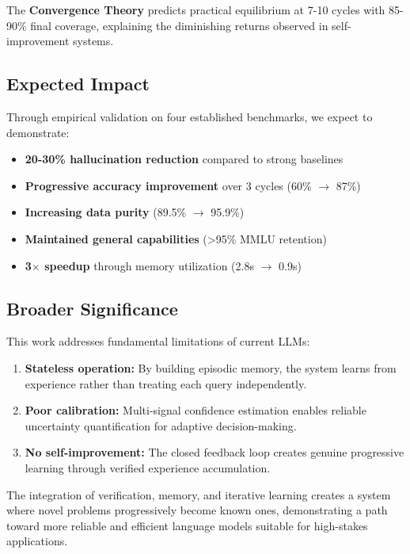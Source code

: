 \documentclass[12pt,a4paper]{article}
\theoremstyle{definition}
\begin{document}
The \textbf{Convergence Theory} predicts practical equilibrium at 7-10 cycles with 85-90\% final coverage, explaining the diminishing returns observed in self-improvement systems.

\subsection{Expected Impact}

Through empirical validation on four established benchmarks, we expect to demonstrate:
\begin{itemize}
    \item \textbf{20-30\% hallucination reduction} compared to strong baselines
    \item \textbf{Progressive accuracy improvement} over 3 cycles (60\% $\rightarrow$ 87\%)
    \item \textbf{Increasing data purity} (89.5\% $\rightarrow$ 95.9\%)
    \item \textbf{Maintained general capabilities} (>95\% MMLU retention)
    \item \textbf{3$\times$ speedup} through memory utilization (2.8s $\rightarrow$ 0.9s)
\end{itemize}

\subsection{Broader Significance}

This work addresses fundamental limitations of current LLMs:
\begin{enumerate}
    \item \textbf{Stateless operation:} By building episodic memory, the system learns from experience rather than treating each query independently.
    
    \item \textbf{Poor calibration:} Multi-signal confidence estimation enables reliable uncertainty quantification for adaptive decision-making.
    
    \item \textbf{No self-improvement:} The closed feedback loop creates genuine progressive learning through verified experience accumulation.
\end{enumerate}

The integration of verification, memory, and iterative learning creates a system where novel problems progressively become known ones, demonstrating a path toward more reliable and efficient language models suitable for high-stakes applications.
\end{document}
